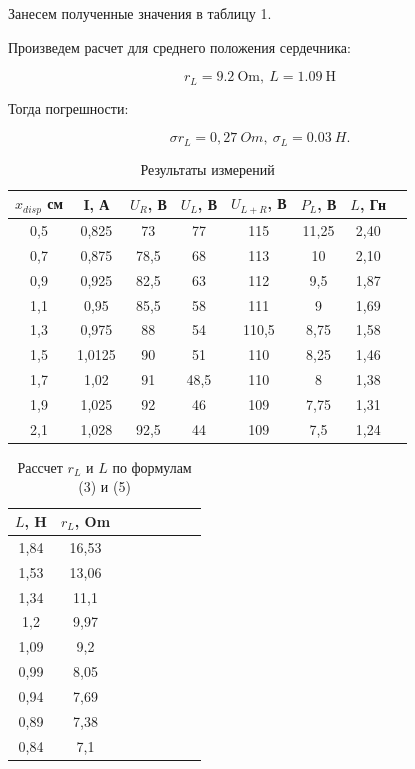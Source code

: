 Занесем полученные значения в таблицу 1.

Произведем расчет для среднего положения сердечника:

$$
r_L = 9.2 \:\text{Om}, \:
L = 1.09\: \text{H}
$$

Тогда погрешности:

$$
\sigma{r_L} = 0,27\: Om, \:\sigma_{L} = 0.03\: H.
$$


\begin{table}[h!]
	\centering
	\caption{Результаты измерений}
	\begin{tabular}{|c|c|c|c|c|c|c|c|}
		\hline
		$x_{disp}$ см & I, А & $U_R$, В & $U_L$, В & $U_{L+R}$, В & $P_L$, В & $L$, Гн \\
		\hline
		0,5 & 0,825 & 73 & 77  & 115 & 11,25 & 2,40  \\
		 \hline
		 0,7 & 0,875 & 78,5 & 68 & 113 & 10 & 2,10 \\
		 \hline
		 0,9 & 0,925 & 82,5 & 63 & 112 & 9,5 & 1,87\\
		 \hline
		 1,1 & 0,95 & 85,5 & 58 & 111 & 9 & 1,69\\
		 \hline
		 1,3 & 0,975 & 88 & 54 & 110,5 & 8,75 & 1,58\\
		 \hline
		 1,5 & 1,0125 & 90 & 51 & 110 & 8,25 & 1,46\\
		 \hline
		 1,7 & 1,02 & 91 & 48,5 & 110 & 8 & 1,38\\
		 \hline
		 1,9 & 1,025 & 92 & 46 & 109 & 7,75 & 1,31\\
		 \hline
		 2,1 & 1,028 & 92,5 & 44 & 109 & 7,5 & 1,24 \\
		\hline
	\end{tabular}%
\label{resT}%
\end{table}%

\begin{table}[h!]
	\centering
	\caption{Рассчет $ r_{L}$ и $ L $ по формулам (3) и (5) }
	\begin{tabular}{|c|c|c|c|c|c|c|c|}
		\hline
		 $ L $, H & $ r_{L}$, Om \\
		\hline
		  1,84 & 16,53  \\
		 \hline
		  1,53 &  13,06 \\
		 \hline
		 1,34 &  11,1 \\
		 \hline
		 1,2 &  9,97\\
		 \hline
		 1,09 & 9,2 \\
		 \hline
		 0,99 & 8,05\\
		 \hline
		 0,94 &  7,69\\
		 \hline
		 0,89 & 7,38\\
		 \hline
	     0,84 & 7,1 \\
		\hline
	\end{tabular}%
\label{resT}%
\end{table}%

